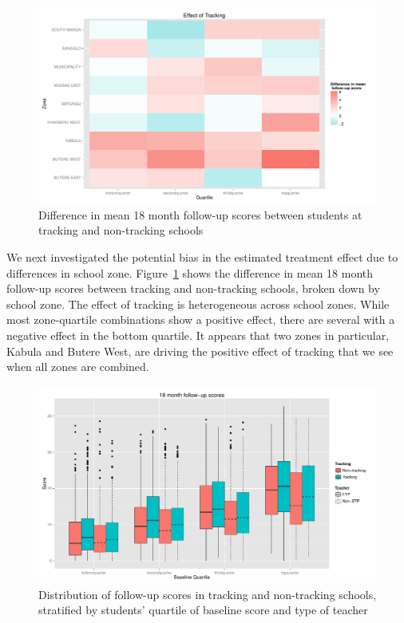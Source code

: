 \documentclass[11pt]{article}
\begin{document}
 \begin{figure}[H]
 \centering
 \includegraphics[scale=0.5]{tracking_by_zone.pdf}
 \caption{Difference in mean 18 month follow-up scores between students at tracking and non-tracking schools}
 \label{fig:stratif-zone}
 \end{figure}
 

We next investigated the potential bias in the estimated treatment effect due to differences in school zone.  Figure~\ref{fig:stratif-zone} shows the difference in mean 18 month follow-up scores between tracking and non-tracking schools, broken down by school zone.  The effect of tracking is heterogeneous across school zones.  While most zone-quartile combinations show a positive effect,  there are several with a negative effect in the bottom quartile.  It appears that two zones in particular, Kabula and Butere West, are driving the positive effect of tracking that we see when all zones are combined. 

 
 \begin{figure}[H]
 \centering
 \includegraphics[scale=0.5]{tracking-etp-stratif.pdf}
 \caption{Distribution of follow-up scores in tracking and non-tracking schools, stratified by students' quartile of baseline score and type of teacher}
 \label{fig:tracking-etp}
 \end{figure}
 
\end{document}
